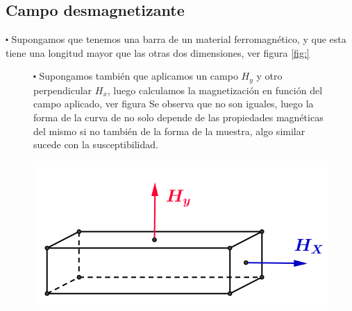 \subsection{Campo desmagnetizante}
$\centerdot$ Supongamos que tenemos una barra de un material ferromagnético, y que esta tiene una longitud mayor que las otras dos dimensiones, ver figura \ref{fig:}





\begin{figure}[H]
\begin{minipage}[b]{0.5\textwidth}
	\vspace{0pt}
$\centerdot$ Supongamos también que aplicamos un campo $H_{y}$ y otro perpendicular $H_{x}$, luego calculamos la magnetización en función del campo aplicado, ver figura Se observa que no son iguales, luego la forma de la curva de no solo depende de las propiedades magnéticas del mismo si no también de la forma de la muestra, algo similar sucede con la susceptibilidad.

\end{minipage}
\begin{minipage}[b]{0.45\linewidth}
	\raggedright
    \includegraphics[width=1.0\textwidth]{./Figures/campoDesmagnetizante0}
    \vspace{0.5cm}
\end{minipage}

\end{figure}


